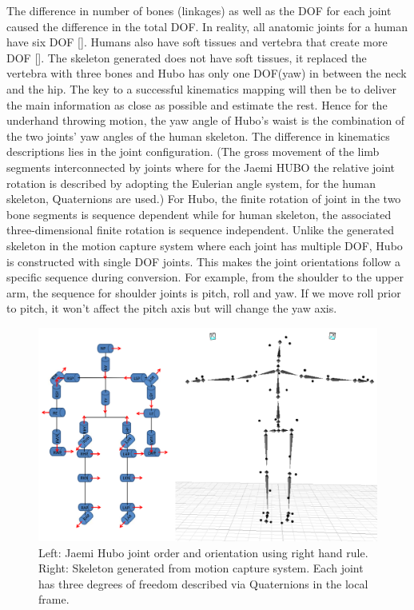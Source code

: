The difference in number of bones (linkages) as well as the DOF for each joint caused the difference in the total DOF. 
In reality, all anatomic joints for a human have six DOF []. 
Humans also have soft tissues and vertebra that create more DOF []. 
The skeleton generated does not have soft tissues, it replaced the vertebra with three bones and Hubo has only one DOF(yaw) in between the neck and the hip. 
The key to a successful kinematics mapping will then be to deliver the main information as close as possible and estimate the rest. 
Hence for the underhand throwing motion, the yaw angle of Hubo's waist is the combination of the two joints' yaw angles of the human skeleton.  %
The difference in kinematics descriptions lies in the joint configuration. 
(The gross movement of the limb segments interconnected by joints where for the Jaemi HUBO the relative joint rotation is described by adopting the Eulerian angle system, for the human skeleton, Quaternions are used.) 
For Hubo, the finite rotation of joint in the two bone segments is sequence dependent while for human skeleton, the associated three-dimensional finite rotation is sequence independent.
Unlike the generated skeleton in the motion capture system where each joint has multiple DOF, Hubo is constructed with single DOF joints. This makes the joint orientations follow a specific sequence during conversion. For example, from the shoulder to the upper arm, the sequence for shoulder joints is pitch, roll and yaw.  If we move roll prior to pitch, it won't affect the pitch axis but will change the yaw axis.

\begin{figure}[t]
  \centering
\includegraphics[width=1.0\columnwidth]{./pix/mocapJoints.png}
  \caption{Left: Jaemi Hubo joint order and orientation using right hand rule.  Right: Skeleton generated from motion capture system.  Each joint has three degrees of freedom described via Quaternions in the local frame.}
  \label{fig:mocap-joints}
\end{figure}

